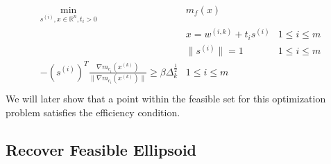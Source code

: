 \documentclass{article}
\newenvironment{comment}
  {\par\medskip
   \color{red}%
   \begin{framed}
   \textbf{Comment: }\ignorespaces}
 {\end{framed}
  \medskip}
\theoremstyle{case}
\newcommand{\xk}{{x^{(k)}}}
\newcommand{\Rn}{\mathbb R^n}
\newcommand{\reals}{\mathbb R}
\newcommand{\dk}{\Delta_k}
\newcommand{\mfk}{{{m}_f}^{(k)}}
\newcommand{\mcik}{{{m}_{c_i}}^{(k)}}
\newcommand{\wik}{{w^{(i, k)}}}
\newcommand{\trsinfset}{{E_\text{infeasible}}}
\newcommand{\trstol}{{\delta_\text{infeasible}}}
\newcommand{\hgik}{{\frac{\nabla m_{c_i}(\xk)}{\|\nabla m_{c_i}(\xk)\|}}}
\begin{document}
\begin{align*}
\label{capcones_tr_subproblem}
\begin{array}{ccc}
\min_{s^{(i)},x\in\Rn,t_i>0} & m_f(x) & \\
 & x = \wik + t _i s^{(i)} & 1 \le i \le m \\
 & \|s^{(i)}\| = 1 & 1 \le i \le m \\
 -\left(s^{(i)}\right)^T\hgik \ge \beta \dk^{\frac 1 2 } & 1 \le i \le m \\
\end{array}
\end{align*}
We will later show that a point within the feasible set for this optimization problem satisfies the efficiency condition.


% 
% 
% 
% 
% 
% 



\subsection{Recover Feasible Ellipsoid}
\end{document}

